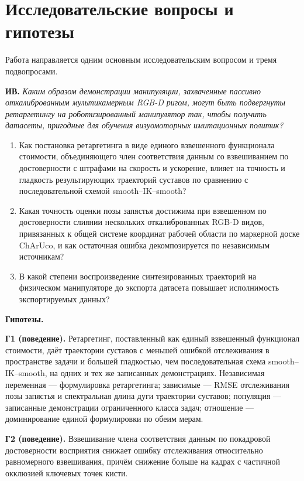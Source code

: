 \documentclass[12pt, a4paper, oneside]{report}
\begin{document}
\section{Исследовательские вопросы и гипотезы}

Работа направляется одним основным исследовательским вопросом и тремя
подвопросами.

\vspace{2mm}
\noindent\textbf{ИВ.} \emph{Каким образом демонстрации манипуляции, захваченные
пассивно откалиброванным мультикамерным RGB-D ригом, могут быть подвергнуты
ретаргетингу на роботизированный манипулятор так, чтобы получить датасеты,
пригодные для обучения визуомоторных имитационных политик?}

\begin{enumerate}[label=\textbf{ИВ\arabic*.}, leftmargin=2.4em]
  \item Как постановка ретаргетинга в виде единого взвешенного функционала
        стоимости, объединяющего член соответствия данным со взвешиванием по
        достоверности с штрафами на скорость и ускорение, влияет на точность и
        гладкость результирующих траекторий суставов по сравнению с
        последовательной схемой smooth--IK--smooth?
  \item Какая точность оценки позы запястья достижима при
        взвешенном по достоверности слиянии нескольких откалиброванных RGB-D
        видов, привязанных к общей системе координат рабочей области по
        маркерной доске ChArUco, и как остаточная ошибка декомпозируется по
        независимым источникам?
  \item В какой степени воспроизведение синтезированных траекторий на
        физическом манипуляторе до экспорта датасета повышает исполнимость
        экспортируемых данных?
\end{enumerate}

\noindent\textbf{Гипотезы.}

\textbf{Г1 (поведение).} Ретаргетинг, поставленный как единый взвешенный
функционал стоимости, даёт траектории суставов с меньшей ошибкой отслеживания в
пространстве задачи и большей гладкостью, чем последовательная схема
smooth--IK--smooth, на одних и тех же записанных демонстрациях. Независимая
переменная --- формулировка ретаргетинга; зависимые --- RMSE отслеживания позы
запястья и спектральная длина дуги траектории суставов; популяция ---
записанные демонстрации ограниченного класса задач; отношение --- доминирование
единой формулировки по обеим мерам.

\textbf{Г2 (поведение).} Взвешивание члена соответствия данным по покадровой
достоверности восприятия снижает ошибку отслеживания относительно равномерного
взвешивания, причём снижение больше на кадрах с частичной окклюзией ключевых
точек кисти.
\end{document}
